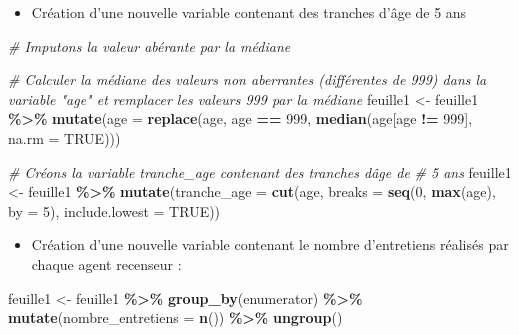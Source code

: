 \documentclass[
]{article}
\newenvironment{Shaded}{\begin{snugshade}}{\end{snugshade}}
\newcommand{\AttributeTok}[1]{\textcolor[rgb]{0.13,0.29,0.53}{#1}}
\newcommand{\CommentTok}[1]{\textcolor[rgb]{0.56,0.35,0.01}{\textit{#1}}}
\newcommand{\ConstantTok}[1]{\textcolor[rgb]{0.56,0.35,0.01}{#1}}
\newcommand{\DecValTok}[1]{\textcolor[rgb]{0.00,0.00,0.81}{#1}}
\newcommand{\FunctionTok}[1]{\textcolor[rgb]{0.13,0.29,0.53}{\textbf{#1}}}
\newcommand{\NormalTok}[1]{#1}
\newcommand{\OtherTok}[1]{\textcolor[rgb]{0.56,0.35,0.01}{#1}}
\newcommand{\SpecialCharTok}[1]{\textcolor[rgb]{0.81,0.36,0.00}{\textbf{#1}}}
\providecommand{\tightlist}{%
  \setlength{\itemsep}{0pt}\setlength{\parskip}{0pt}}
\begin{document}
\begin{itemize}
\tightlist
\item
  Création d'une nouvelle variable contenant des tranches d'âge de 5 ans
\end{itemize}

\begin{Shaded}
\begin{Highlighting}[]
\CommentTok{\# Imputons la valeur abérante par la médiane}

\CommentTok{\# Calculer la médiane des valeurs non aberrantes (différentes de 999) dans la variable "age" et remplacer les valeurs 999 par la médiane}
\NormalTok{feuille1 }\OtherTok{\textless{}{-}}\NormalTok{ feuille1 }\SpecialCharTok{\%\textgreater{}\%}
  \FunctionTok{mutate}\NormalTok{(}\AttributeTok{age =} \FunctionTok{replace}\NormalTok{(age, age }\SpecialCharTok{==} \DecValTok{999}\NormalTok{, }\FunctionTok{median}\NormalTok{(age[age }\SpecialCharTok{!=} \DecValTok{999}\NormalTok{], }\AttributeTok{na.rm =} \ConstantTok{TRUE}\NormalTok{)))}


\CommentTok{\# Créons la variable tranche\_age contenant des tranches d\textquotesingle{}âge de}
\CommentTok{\# 5 ans}
\NormalTok{feuille1 }\OtherTok{\textless{}{-}}\NormalTok{ feuille1 }\SpecialCharTok{\%\textgreater{}\%}
  \FunctionTok{mutate}\NormalTok{(}\AttributeTok{tranche\_age =} \FunctionTok{cut}\NormalTok{(age, }\AttributeTok{breaks =} \FunctionTok{seq}\NormalTok{(}\DecValTok{0}\NormalTok{, }\FunctionTok{max}\NormalTok{(age), }\AttributeTok{by =} \DecValTok{5}\NormalTok{), }\AttributeTok{include.lowest =} \ConstantTok{TRUE}\NormalTok{))}
\end{Highlighting}
\end{Shaded}

\begin{itemize}
\tightlist
\item
  Création d'une nouvelle variable contenant le nombre d'entretiens
  réalisés par chaque agent recenseur :
\end{itemize}

\begin{Shaded}
\begin{Highlighting}[]
\NormalTok{feuille1 }\OtherTok{\textless{}{-}}\NormalTok{ feuille1 }\SpecialCharTok{\%\textgreater{}\%}
  \FunctionTok{group\_by}\NormalTok{(enumerator) }\SpecialCharTok{\%\textgreater{}\%}
  \FunctionTok{mutate}\NormalTok{(}\AttributeTok{nombre\_entretiens =} \FunctionTok{n}\NormalTok{()) }\SpecialCharTok{\%\textgreater{}\%}
  \FunctionTok{ungroup}\NormalTok{()}
\end{Highlighting}
\end{Shaded}
\end{document}
